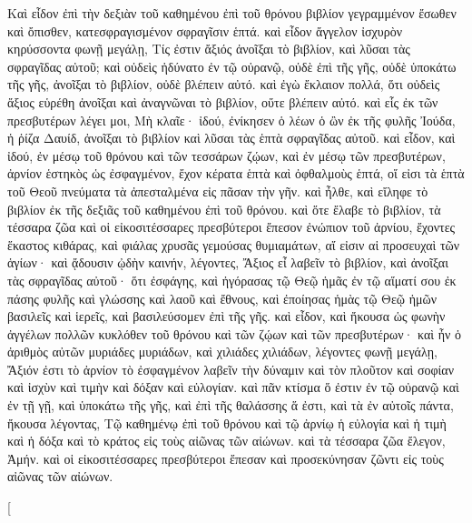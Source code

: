 \begin{pages}
    \begin{Leftside}
        \beginnumbering
		Καὶ εἶδον ἐπὶ τὴν δεξιὰν τοῦ καθημένου ἐπὶ τοῦ θρόνου βιβλίον γεγραμμένον ἔσωθεν καὶ ὄπισθεν, κατεσφραγισμένον σφραγῖσιν ἑπτά. καὶ εἶδον ἄγγελον ἰσχυρὸν κηρύσσοντα φωνῇ μεγάλῃ, Τίς ἐστιν ἄξιός ἀνοῖξαι τὸ βιβλίον, καὶ λῦσαι τὰς σφραγῖδας αὐτοῦ; καὶ οὐδεὶς ἠδύνατο ἐν τῷ οὐρανῷ, οὐδὲ ἐπὶ τῆς γῆς, οὐδὲ ὑποκάτω τῆς γῆς, ἀνοῖξαι τὸ βιβλίον, οὐδὲ βλέπειν αὐτό. καὶ ἐγὼ ἔκλαιον πολλά, ὅτι οὐδεὶς ἄξιος εὑρέθη ἀνοῖξαι καὶ ἀναγνῶναι τὸ βιβλίον, οὔτε βλέπειν αὐτό. 
		\pend
		\pstart
		καὶ εἷς ἐκ τῶν πρεσβυτέρων λέγει μοι, Μὴ κλαῖε· ἰδού, ἐνίκησεν ὁ λέων ὁ ὢν ἐκ τῆς φυλῆς Ἰούδα, ἡ ῥίζα Δαυίδ, ἀνοῖξαι τὸ βιβλίον καὶ λῦσαι τὰς ἑπτὰ σφραγῖδας αὐτοῦ. καὶ εἶδον, καὶ ἰδού, ἐν μέσῳ τοῦ θρόνου καὶ τῶν τεσσάρων ζῴων, καὶ ἐν μέσῳ τῶν πρεσβυτέρων, ἀρνίον ἑστηκὸς ὡς ἐσφαγμένον, ἔχον κέρατα ἑπτὰ καὶ ὀφθαλμοὺς ἑπτά, οἵ εἰσι τὰ ἑπτὰ τοῦ Θεοῦ πνεύματα τὰ ἀπεσταλμένα εἰς πᾶσαν τὴν γῆν. καὶ ἦλθε, καὶ εἴληφε τὸ βιβλίον ἐκ τῆς δεξιᾶς τοῦ καθημένου ἐπὶ τοῦ θρόνου. 
		\pend
		\pstart
		καὶ ὅτε ἔλαβε τὸ βιβλίον, τὰ τέσσαρα ζῶα καὶ οἱ εἰκοσιτέσσαρες πρεσβύτεροι ἔπεσον ἐνώπιον τοῦ ἀρνίου, ἔχοντες ἕκαστος κιθάρας, καὶ φιάλας χρυσᾶς γεμούσας θυμιαμάτων, αἵ εἰσιν αἱ προσευχαὶ τῶν ἁγίων· καὶ ᾄδουσιν ᾠδὴν καινήν, λέγοντες, Ἄξιος εἶ λαβεῖν τὸ βιβλίον, καὶ ἀνοῖξαι τὰς σφραγῖδας αὐτοῦ· ὅτι ἐσφάγης, καὶ ἠγόρασας τῷ Θεῷ ἡμᾶς ἐν τῷ αἵματί σου ἐκ πάσης φυλῆς καὶ γλώσσης καὶ λαοῦ καὶ ἔθνους, καὶ ἐποίησας ἡμὰς τῷ Θεῷ ἡμῶν βασιλεῖς καὶ ἱερεῖς, καὶ βασιλεύσομεν ἐπὶ τῆς γῆς. 
		\pend
		\pstart
		καὶ εἶδον, καὶ ἤκουσα ὡς φωνὴν ἀγγέλων πολλῶν κυκλόθεν τοῦ θρόνου καὶ τῶν ζῴων καὶ τῶν πρεσβυτέρων· καὶ ἦν ὁ ἀριθμὸς αὐτῶν μυριάδες μυριάδων, καὶ χιλιάδες χιλιάδων, λέγοντες φωνῇ μεγάλῃ, Ἄξιόν ἐστι τὸ ἀρνίον τὸ ἐσφαγμένον λαβεῖν τὴν δύναμιν καὶ τὸν πλοῦτον καὶ σοφίαν καὶ ἰσχὺν καὶ τιμὴν καὶ δόξαν καὶ εὐλογίαν. καὶ πᾶν κτίσμα ὅ ἐστιν ἐν τῷ οὐρανῷ καὶ ἐν τῇ γῇ, καὶ ὑποκάτω τῆς γῆς, καὶ ἐπὶ τῆς θαλάσσης ἅ ἐστι, καὶ τὰ ἐν αὐτοῖς πάντα, ἤκουσα λέγοντας, Τῷ καθημένῳ ἐπὶ τοῦ θρόνου καὶ τῷ ἀρνίῳ ἡ εὐλογία καὶ ἡ τιμὴ καὶ ἡ δόξα καὶ τὸ κράτος εἰς τοὺς αἰῶνας τῶν αἰώνων. καὶ τὰ τέσσαρα ζῶα ἔλεγον, Ἀμήν. καὶ οἱ εἰκοσιτέσσαρες πρεσβύτεροι ἔπεσαν καὶ προσεκύνησαν ζῶντι εἰς τοὺς αἰῶνας τῶν αἰώνων.
		\pend
        \endnumbering
    \end{Leftside}
    \begin{Rightside}
        \beginnumbering
        \pstart[

\end{Rightside}
\end{pages}
